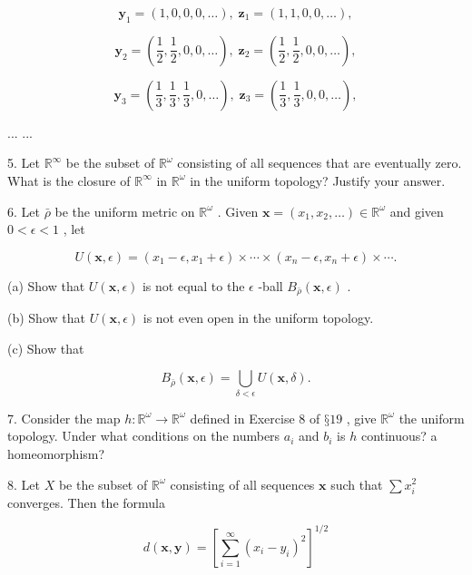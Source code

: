 \[
{\mathbf{y}}_{1} = \left( {1,0,0,0,\ldots }\right) ,\;{\mathbf{z}}_{1} = \left( {1,1,0,0,\ldots }\right) ,
\]

\[
{\mathbf{y}}_{2} = \left( {\frac{1}{2},\frac{1}{2},0,0,\ldots }\right) ,\;{\mathbf{z}}_{2} = \left( {\frac{1}{2},\frac{1}{2},0,0,\ldots }\right) ,
\]

\[
{\mathbf{y}}_{3} = \left( {\frac{1}{3},\frac{1}{3},\frac{1}{3},0,\ldots }\right) ,\;{\mathbf{z}}_{3} = \left( {\frac{1}{3},\frac{1}{3},0,0,\ldots }\right) ,
\]

... ...

5. Let \({\mathbb{R}}^{\infty }\) be the subset of \({\mathbb{R}}^{\omega }\) consisting of all sequences that are eventually zero. What is the closure of \({\mathbb{R}}^{\infty }\) in \({\mathbb{R}}^{\omega }\) in the uniform topology? Justify your answer.

6. Let \(\bar{\rho }\) be the uniform metric on \({\mathbb{R}}^{\omega }\) . Given \(\mathbf{x} = \left( {{x}_{1},{x}_{2},\ldots }\right)  \in  {\mathbb{R}}^{\omega }\) and given \(0 < \epsilon  < 1\) , let

\[
U\left( {\mathbf{x},\epsilon }\right)  = \left( {{x}_{1} - \epsilon ,{x}_{1} + \epsilon }\right)  \times  \cdots  \times  \left( {{x}_{n} - \epsilon ,{x}_{n} + \epsilon }\right)  \times  \cdots .
\]

(a) Show that \(U\left( {\mathbf{x},\epsilon }\right)\) is not equal to the \(\epsilon\) -ball \({B}_{\bar{\rho }}\left( {\mathbf{x},\epsilon }\right)\) .

(b) Show that \(U\left( {\mathbf{x},\epsilon }\right)\) is not even open in the uniform topology.

(c) Show that

\[
{B}_{\bar{\rho }}\left( {\mathbf{x},\epsilon }\right)  = \mathop{\bigcup }\limits_{{\delta  < \epsilon }}U\left( {\mathbf{x},\delta }\right) .
\]

7. Consider the map \(h : {\mathbb{R}}^{\omega } \rightarrow  {\mathbb{R}}^{\omega }\) defined in Exercise 8 of \(§{19}\) , give \({\mathbb{R}}^{\omega }\) the uniform topology. Under what conditions on the numbers \({a}_{i}\) and \({b}_{i}\) is \(h\) continuous? a homeomorphism?

8. Let \(X\) be the subset of \({\mathbb{R}}^{\omega }\) consisting of all sequences \(\mathbf{x}\) such that \(\sum {x}_{i}^{2}\) converges. Then the formula

\[
d\left( {\mathbf{x},\mathbf{y}}\right)  = {\left\lbrack  \mathop{\sum }\limits_{{i = 1}}^{\infty }{\left( {x}_{i} - {y}_{i}\right) }^{2}\right\rbrack  }^{1/2}
\]

